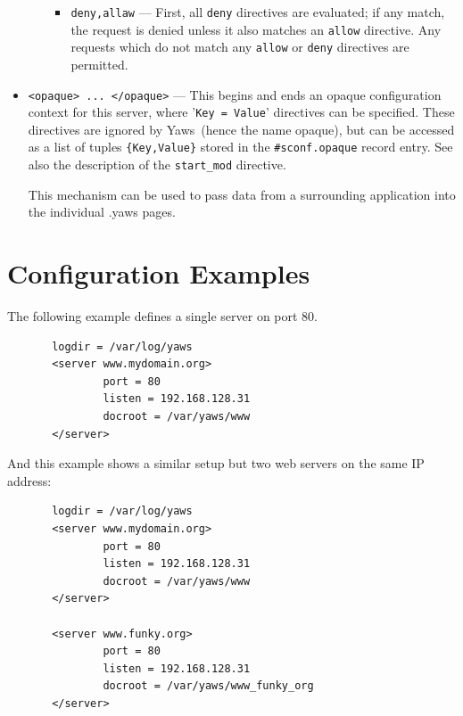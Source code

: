 \documentclass[11pt,oneside,english]{book}
\newcommand{\Yaws}            %
        {{\sc Yaws}}
\begin{document}
\begin{itemize}
\begin{itemize}
\begin{itemize}
                  \item \verb+deny,allaw+ --- First, all \verb+deny+ directives
                    are evaluated; if any match, the request is denied unless it
                    also matches an \verb+allow+ directive. Any requests which
                    do not match any \verb+allow+ or \verb+deny+ directives are
                    permitted.
                \end{itemize}
              \end{itemize}

\item       \verb+<opaque> ... </opaque>+ ---
              This begins and ends an opaque configuration context for this
              server, where '\verb+Key = Value+' directives can be
              specified. These directives are ignored by \Yaws\ (hence the name
              opaque), but can be accessed as a list of tuples
              \verb+{Key,Value}+ stored in the \verb+#sconf.opaque+ record
              entry. See also the description of the \verb+start_mod+ directive.

              This mechanism can be used to pass data from a surrounding
              application into the individual .yaws pages.
\end{itemize}




\section{Configuration Examples}

       The  following  example  defines a single server on
       port 80.

\begin{verbatim}
       logdir = /var/log/yaws
       <server www.mydomain.org>
               port = 80
               listen = 192.168.128.31
               docroot = /var/yaws/www
       </server>
\end{verbatim}

       And this example shows a similar setup but two web
       servers on the same IP address:

\begin{verbatim}
       logdir = /var/log/yaws
       <server www.mydomain.org>
               port = 80
               listen = 192.168.128.31
               docroot = /var/yaws/www
       </server>

       <server www.funky.org>
               port = 80
               listen = 192.168.128.31
               docroot = /var/yaws/www_funky_org
       </server>
\end{verbatim}
\end{document}
